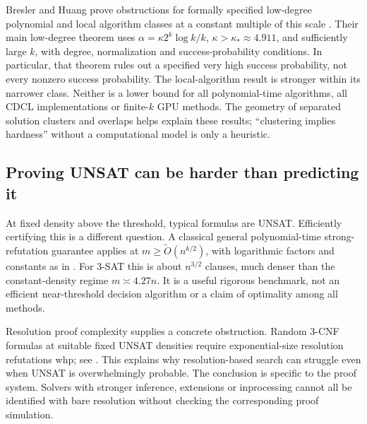 Bresler and Huang prove obstructions for formally specified low-degree
polynomial and local algorithm classes at a constant multiple of this scale
\citep[Theorems 2.6 and 2.13]{bresler2021}. Their main low-degree theorem
uses $\alpha=\kappa2^k\log k/k$, $\kappa>\kappa_*\approx4.911$, and
sufficiently large $k$, with degree, normalization and success-probability
conditions. In particular, that theorem rules out a specified very high
success probability, not every nonzero success probability. The local-algorithm
result is stronger within its narrower class. Neither is a lower bound for
all polynomial-time algorithms, all CDCL implementations or finite-$k$ GPU
methods. The geometry of separated solution clusters and overlaps helps
explain these results; ``clustering implies hardness'' without a computational
model is only a heuristic.

\subsection{Proving UNSAT can be harder than predicting it}
At fixed density above the threshold, typical formulas are UNSAT. Efficiently
certifying this is a different question. A classical general polynomial-time
strong-refutation guarantee applies at
$m\ge\widetilde O(n^{k/2})$, with logarithmic factors and constants as in
\citet[Theorem 2.3 and Section 4]{allen2015}. For $3$-SAT this is about
$n^{3/2}$ clauses, much denser than the constant-density regime
$m\asymp4.27n$. It is a useful rigorous benchmark, not an efficient
near-threshold decision algorithm or a claim of optimality among all methods.

Resolution proof complexity supplies a concrete obstruction. Random $3$-CNF
formulas at suitable fixed UNSAT densities require exponential-size resolution
refutations whp; see \citet[Section 4.3]{ben2001}. This explains why
resolution-based search can struggle even when UNSAT is overwhelmingly
probable. The conclusion is specific to the proof system. Solvers with stronger
inference, extensions or inprocessing cannot all be identified with bare
resolution without checking the corresponding proof simulation.
